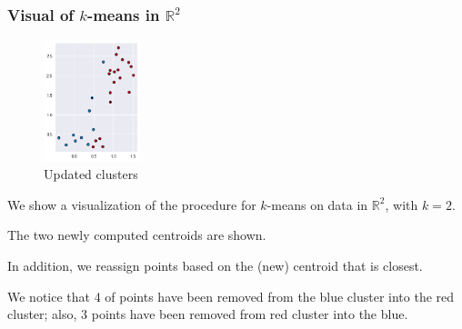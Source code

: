 \documentclass[smaller]{beamer}
\theoremstyle{example}
\begin{document}
\begin{frame}
    \frametitle{Visual of $k$-means in $\mathbb R^2$}
    
    \begin{figure}
        \begin{center}
            \includegraphics[width=0.25\textwidth]{../../Images/kmeans_2.png}
        \end{center}
        \caption{Updated clusters}
    \end{figure}

    We show a visualization of the procedure for $k$-means on data in $\mathbb R^2$, with $k=2$.
    \vspace*{12pt}

    The two newly computed centroids are shown. 
    
    In addition, we reassign points based on the (new) centroid that is closest. 

    We notice that 4 of points have been removed from the blue cluster into the red cluster; also, 3 points have been removed from red cluster into the blue.

\vfill
\end{frame}
\end{document}
